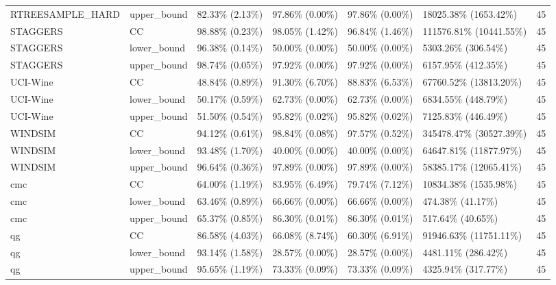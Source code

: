 \begin{tabular}{llllllr}
RTREESAMPLE\_HARD & upper\_bound &   82.33\% (2.13\%) & 97.86\% (0.00\%) &     97.86\% (0.00\%) &   18025.38\% (1653.42\%) &    45 \\
        STAGGERS &          CC &   98.88\% (0.23\%) & 98.05\% (1.42\%) &     96.84\% (1.46\%) & 111576.81\% (10441.55\%) &    45 \\
        STAGGERS & lower\_bound &   96.38\% (0.14\%) & 50.00\% (0.00\%) &     50.00\% (0.00\%) &     5303.26\% (306.54\%) &    45 \\
        STAGGERS & upper\_bound &   98.74\% (0.05\%) & 97.92\% (0.00\%) &     97.92\% (0.00\%) &     6157.95\% (412.35\%) &    45 \\
        UCI-Wine &          CC &   48.84\% (0.89\%) & 91.30\% (6.70\%) &     88.83\% (6.53\%) &  67760.52\% (13813.20\%) &    45 \\
        UCI-Wine & lower\_bound &   50.17\% (0.59\%) & 62.73\% (0.00\%) &     62.73\% (0.00\%) &     6834.55\% (448.79\%) &    45 \\
        UCI-Wine & upper\_bound &   51.50\% (0.54\%) & 95.82\% (0.02\%) &     95.82\% (0.02\%) &     7125.83\% (446.49\%) &    45 \\
         WINDSIM &          CC &   94.12\% (0.61\%) & 98.84\% (0.08\%) &     97.57\% (0.52\%) & 345478.47\% (30527.39\%) &    45 \\
         WINDSIM & lower\_bound &   93.48\% (1.70\%) & 40.00\% (0.00\%) &     40.00\% (0.00\%) &  64647.81\% (11877.97\%) &    45 \\
         WINDSIM & upper\_bound &   96.64\% (0.36\%) & 97.89\% (0.00\%) &     97.89\% (0.00\%) &  58385.17\% (12065.41\%) &    45 \\
             cmc &          CC &   64.00\% (1.19\%) & 83.95\% (6.49\%) &     79.74\% (7.12\%) &   10834.38\% (1535.98\%) &    45 \\
             cmc & lower\_bound &   63.46\% (0.89\%) & 66.66\% (0.00\%) &     66.66\% (0.00\%) &       474.38\% (41.17\%) &    45 \\
             cmc & upper\_bound &   65.37\% (0.85\%) & 86.30\% (0.01\%) &     86.30\% (0.01\%) &       517.64\% (40.65\%) &    45 \\
              qg &          CC &   86.58\% (4.03\%) & 66.08\% (8.74\%) &     60.30\% (6.91\%) &  91946.63\% (11751.11\%) &    45 \\
              qg & lower\_bound &   93.14\% (1.58\%) & 28.57\% (0.00\%) &     28.57\% (0.00\%) &     4481.11\% (286.42\%) &    45 \\
              qg & upper\_bound &   95.65\% (1.19\%) & 73.33\% (0.09\%) &     73.33\% (0.09\%) &     4325.94\% (317.77\%) &    45 \\
\bottomrule
\end{tabular}
